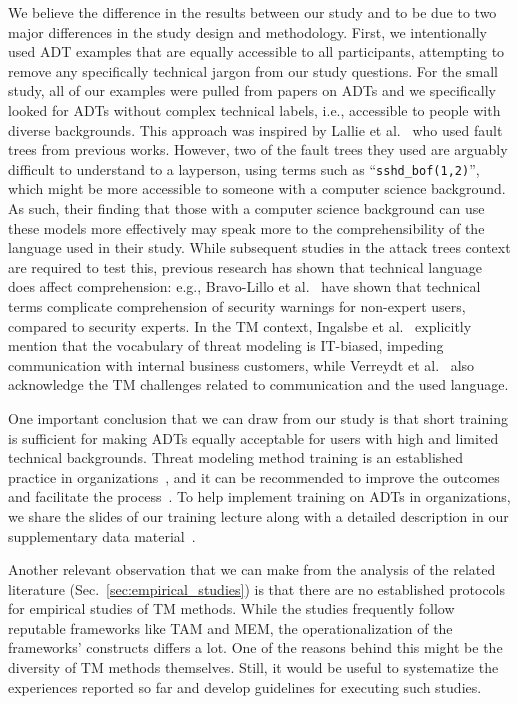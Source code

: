 We believe the difference in the results between our study and \cite{lallieEmpiricalEvaluationEffectiveness2017} to be due to two major differences in the study design and methodology. First, we intentionally used ADT examples that are equally accessible to all participants, attempting to remove any specifically technical jargon from our study questions. For the small study, all of our examples were pulled from papers on ADTs and we specifically looked for ADTs without complex technical labels, i.e., accessible to people with diverse backgrounds. This approach was inspired by Lallie et al.~\cite{lallieEmpiricalEvaluationEffectiveness2017} who used fault trees from previous works. However, two of the fault trees they used are arguably difficult to understand to a layperson, using terms such as ``\texttt{sshd\_bof(1,2)}'', which might be more accessible to someone with a computer science background. As such, their finding that those with a computer science background can use these models more effectively may speak more to the comprehensibility of the language used in their study. While subsequent studies in the attack trees context are required to test this,  previous research has shown that technical language does affect comprehension: e.g., Bravo-Lillo et al.~\cite{bravo2010bridging} have shown that technical terms complicate comprehension of security warnings for non-expert users, compared to security experts. In the TM context, Ingalsbe et al.~\cite{ingalsbe2008threat} explicitly mention that the vocabulary of threat modeling is IT-biased, impeding communication with internal business customers, while Verreydt et al.~\cite{verreydt2024threat} also acknowledge the TM challenges related to communication and the used language. 


One important conclusion that we can draw from our study is that short training is sufficient for making ADTs equally acceptable for users with high and limited technical backgrounds. Threat modeling method training is an established practice in organizations~\cite{verreydt2024threat}, and it can be recommended to improve the outcomes and facilitate the process~\cite{cruzes2018challenges,stevens2018battle}. To help implement training on ADTs in organizations, we share the slides of our training lecture along with a detailed description in our supplementary data material~\cite{zenodo-dataset}.   


Another relevant observation that we can make from the analysis of the related literature (Sec.~\ref{sec:empirical_studies}) is that there are no established protocols for empirical studies of TM methods. While the studies frequently follow reputable frameworks like TAM and MEM, the operationalization of the frameworks' constructs differs a lot. One of the reasons behind this might be the diversity of TM methods themselves. Still, it would be useful to systematize the experiences reported so far and develop guidelines for executing such studies.  

